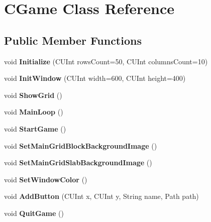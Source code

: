 \hypertarget{classCGame}{\section{C\-Game Class Reference}
\label{classCGame}
}
\subsection*{Public Member Functions}
\begin{DoxyCompactItemize}
\item 
\hypertarget{classCGame_a4da7ce24984c52382edb77b7b6271e56}{void {\bfseries Initialize} (C\-U\-Int rows\-Count=50, C\-U\-Int columns\-Count=10)}\label{classCGame_a4da7ce24984c52382edb77b7b6271e56}

\item 
\hypertarget{classCGame_a04641889f2aa31b7742158d9246bf3bd}{void {\bfseries Init\-Window} (C\-U\-Int width=600, C\-U\-Int height=400)}\label{classCGame_a04641889f2aa31b7742158d9246bf3bd}

\item 
\hypertarget{classCGame_a16f0e8ee75a18c3b8e2044069bb8d12d}{void {\bfseries Show\-Grid} ()}\label{classCGame_a16f0e8ee75a18c3b8e2044069bb8d12d}

\item 
\hypertarget{classCGame_a526664bc74d203e16962372fb850328e}{void {\bfseries Main\-Loop} ()}\label{classCGame_a526664bc74d203e16962372fb850328e}

\item 
\hypertarget{classCGame_af11fa563908ad1685e836b5c375242ab}{void {\bfseries Start\-Game} ()}\label{classCGame_af11fa563908ad1685e836b5c375242ab}

\item 
\hypertarget{classCGame_a580783d1cc0185d1e3e31035e79a1c96}{void {\bfseries Set\-Main\-Grid\-Block\-Background\-Image} ()}\label{classCGame_a580783d1cc0185d1e3e31035e79a1c96}

\item 
\hypertarget{classCGame_a9db32262a94ffcbaae8edbb1ced9b5e7}{void {\bfseries Set\-Main\-Grid\-Slab\-Background\-Image} ()}\label{classCGame_a9db32262a94ffcbaae8edbb1ced9b5e7}

\item 
\hypertarget{classCGame_aeac42171405ac84f294ba9054c06962a}{void {\bfseries Set\-Window\-Color} ()}\label{classCGame_aeac42171405ac84f294ba9054c06962a}

\item 
\hypertarget{classCGame_a5ad2f58befd0a818afe9545aa318f890}{void {\bfseries Add\-Button} (C\-U\-Int x, C\-U\-Int y, String name, Path path)}\label{classCGame_a5ad2f58befd0a818afe9545aa318f890}

\item 
\hypertarget{classCGame_a375d36200686f8d3dfeb930bb549b97f}{void {\bfseries Quit\-Game} ()}\label{classCGame_a375d36200686f8d3dfeb930bb549b97f}

\end{DoxyCompactItemize}
